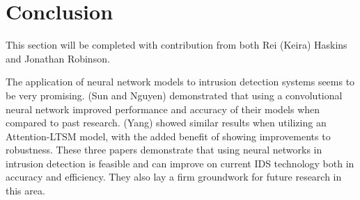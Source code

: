 \section{Conclusion}
This section will be completed with contribution from both Rei (Keira) Haskins and Jonathan Robinson.

The application of neural network models to intrusion detection systems seems to be very promising. (Sun and Nguyen) demonstrated that using a convolutional neural network improved performance and accuracy of their models when compared to past research. (Yang) showed similar results when utilizing an Attention-LTSM model, with the added benefit of showing improvements to robustness. These three papers demonstrate that using neural networks in intrusion detection is feasible and can improve on current IDS technology both in accuracy and efficiency. They also lay a firm groundwork for future research in this area. 
